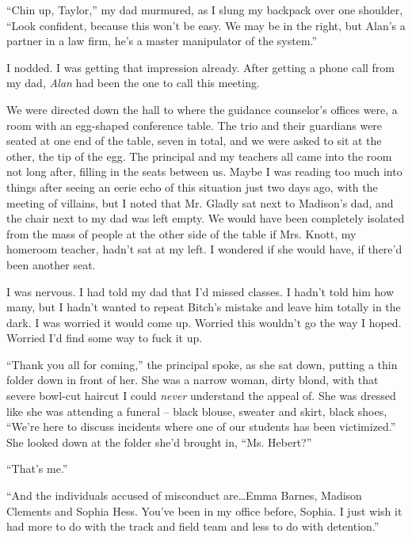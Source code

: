 ``Chin up, Taylor,'' my dad murmured, as I slung my backpack over one shoulder, ``Look confident, because this won't be easy.  We may be in the right, but Alan's a partner in a law firm, he's a master manipulator of the system.''



I nodded.  I was getting that impression already.  After getting a phone call from my dad, \emph{Alan }had been the one to call this meeting.



We were directed down the hall to where the guidance counselor's offices were, a room with an egg-shaped conference table.  The trio and their guardians were seated at one end of the table, seven in total, and we were asked to sit at the other, the tip of the egg.  The principal and my teachers all came into the room not long after, filling in the seats between us.  Maybe I was reading too much into things after seeing an eerie echo of this situation just two days ago, with the meeting of villains, but I noted that Mr. Gladly sat next to Madison's dad, and the chair next to my dad was left empty.  We would have been completely isolated from the mass of people at the other side of the table if Mrs. Knott, my homeroom teacher, hadn't sat at my left.  I wondered if she would have, if there'd been another seat.



I was nervous.  I had told my dad that I'd missed classes.  I hadn't told him how many, but I hadn't wanted to repeat Bitch's mistake and leave him totally in the dark.  I was worried it would come up.  Worried this wouldn't go the way I hoped.  Worried I'd find some way to fuck it up.



``Thank you all for coming,'' the principal spoke, as she sat down, putting a thin folder down in front of her.  She was a narrow woman, dirty blond, with that severe bowl-cut haircut I could \emph{never} understand the appeal of.  She was dressed like she was attending a funeral – black blouse, sweater and skirt, black shoes, ``We're here to discuss incidents where one of our students has been victimized.''  She looked down at the folder she'd brought in, ``Ms. Hebert?''



``That's me.''



``And the individuals accused of misconduct are\ldots  Emma Barnes, Madison Clements and Sophia Hess.  You've been in my office before, Sophia.  I just wish it had more to do with the track and field team and less to do with detention.''



